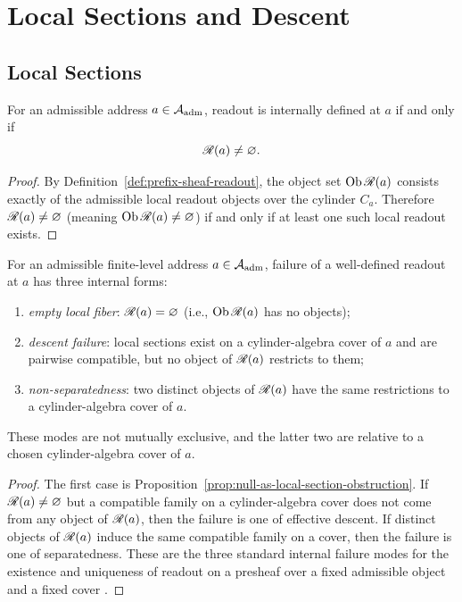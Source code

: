 \section{Local Sections and Descent}
\label{sec:descent}
\label{sec:descent-groupoid}

\subsection{Local Sections}

\begin{proposition}
\label{prop:null-as-local-section-obstruction}
For an admissible address $a\in\mathcal{A}_{\mathrm{adm}}$, readout is internally defined at $a$ if
and only if
\[
\mathscr{R}(a)\neq\varnothing.
\]
\end{proposition}

\begin{proof}
By Definition~\ref{def:prefix-sheaf-readout}, the object set
$\operatorname{Ob}\mathscr{R}(a)$ consists exactly of the admissible local readout objects over
the cylinder $C_a$.  Therefore $\mathscr{R}(a)\neq\varnothing$ (meaning
$\operatorname{Ob}\mathscr{R}(a)\neq\varnothing$) if and only if at least one such local readout
exists.
\end{proof}

\begin{corollary}
\label{cor:null-trichotomy-local-section}
For an admissible finite-level address $a\in\mathcal{A}_{\mathrm{adm}}$, failure of a well-defined
readout at $a$ has three internal
forms:
\begin{enumerate}[label=\textup{(\arabic*)}]
\item \emph{empty local fiber}: $\mathscr{R}(a)=\varnothing$ (i.e., $\operatorname{Ob}\mathscr{R}(a)$ has
no objects);
\item \emph{descent failure}: local sections exist on a cylinder-algebra cover of $a$
and are pairwise compatible, but no object of $\mathscr{R}(a)$ restricts to them;
\item \emph{non-separatedness}: two distinct objects of $\mathscr{R}(a)$ have the
same restrictions to a cylinder-algebra cover of $a$.
\end{enumerate}
These modes are not mutually exclusive, and the latter two are relative to a
chosen cylinder-algebra cover of $a$.
\end{corollary}

\begin{proof}
The first case is Proposition~\ref{prop:null-as-local-section-obstruction}.  If
$\mathscr{R}(a)\neq\varnothing$ but a compatible family on a cylinder-algebra cover does not
come from any object of $\mathscr{R}(a)$, then the failure is one of effective
descent.  If distinct objects of $\mathscr{R}(a)$ induce the same compatible family
on a cover, then the failure is one of separatedness.  These are the three
standard internal failure modes for the existence and uniqueness of readout on
a presheaf over a fixed admissible object and a fixed cover
\cite[\S II.1--2]{MacLaneMoerdijk1992}.
\end{proof}


